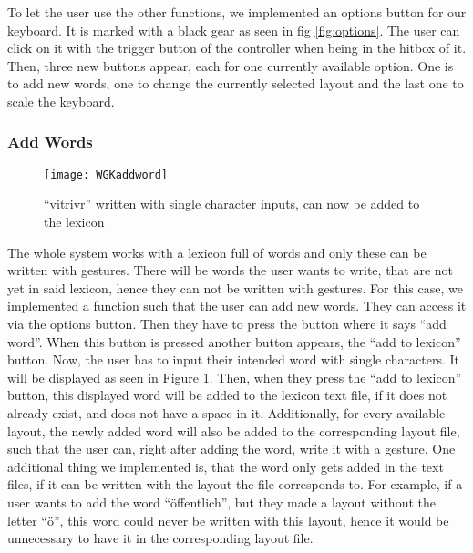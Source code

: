 To let the user use the other functions, we implemented an options button for our keyboard. It is marked with a black gear as seen in fig \ref{fig:options}. The user can click on it with the trigger button of the controller when being in the hitbox of it. Then, three new buttons appear, each for one currently available option. One is to add new words, one to change the currently selected layout and the last one to scale the keyboard.

\subsubsection{Add Words}
\begin{figure}
    \centering
    \texttt{[image: WGKaddword]}
    \caption{``vitrivr'' written with single character inputs, can now be added to the lexicon}
    \label{fig:addword}
\end{figure}
The whole system works with a lexicon full of words and only these can be written with gestures. There will be words the user wants to write, that are not yet in said lexicon, hence they can not be written with gestures. For this case, we implemented a function such that the user can add new words. They can access it via the options button. Then they have to press the button where it says ``add word''. When this button is pressed another button appears, the ``add to lexicon'' button. Now, the user has to input their intended word with single characters. It will be displayed as seen in Figure \ref{fig:addword}. Then, when they press the ``add to lexicon'' button, this displayed word will be added to the lexicon text file, if it does not already exist, and does not have a space in it. Additionally, for every available layout, the newly added word will also be added to the corresponding layout file, such that the user can, right after adding the word, write it with a gesture. One additional thing we implemented is, that the word only gets added in the text files, if it can be written with the layout the file corresponds to. For example, if a user wants to add the word ``öffentlich'', but they made a layout without the letter ``ö'', this word could never be written with this layout, hence it would be unnecessary to have it in the corresponding layout file.

